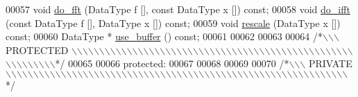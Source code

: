 \begin{DoxyCode}
00057     \textcolor{keywordtype}{void}                \hyperlink{a00010_a4c5b863a285c5a87f38517735cbf1352}{do\_fft} (DataType f [], \textcolor{keyword}{const} DataType x []) \textcolor{keyword}{const};
00058     \textcolor{keywordtype}{void}                \hyperlink{a00010_a8ab2e0da482cea88a61f01d58c074989}{do\_ifft} (\textcolor{keyword}{const} DataType f [], DataType x []) \textcolor{keyword}{const};
00059     \textcolor{keywordtype}{void}                \hyperlink{a00010_a9e30fff775905b1059aa9299004ee228}{rescale} (DataType x []) \textcolor{keyword}{const};
00060     DataType *      \hyperlink{a00010_af1fcd007f1cf0b41bd2188e0b3cd5cca}{use\_buffer} () \textcolor{keyword}{const};
00061 
00062 
00063 
00064 \textcolor{comment}{/*\(\backslash\)\(\backslash\)\(\backslash\) PROTECTED \(\backslash\)\(\backslash\)\(\backslash\)\(\backslash\)\(\backslash\)\(\backslash\)\(\backslash\)\(\backslash\)\(\backslash\)\(\backslash\)\(\backslash\)\(\backslash\)\(\backslash\)\(\backslash\)\(\backslash\)\(\backslash\)\(\backslash\)\(\backslash\)\(\backslash\)\(\backslash\)\(\backslash\)\(\backslash\)\(\backslash\)\(\backslash\)\(\backslash\)\(\backslash\)\(\backslash\)\(\backslash\)\(\backslash\)\(\backslash\)\(\backslash\)\(\backslash\)\(\backslash\)\(\backslash\)\(\backslash\)\(\backslash\)\(\backslash\)\(\backslash\)\(\backslash\)\(\backslash\)\(\backslash\)\(\backslash\)\(\backslash\)\(\backslash\)\(\backslash\)\(\backslash\)\(\backslash\)\(\backslash\)\(\backslash\)\(\backslash\)\(\backslash\)\(\backslash\)\(\backslash\)\(\backslash\)\(\backslash\)\(\backslash\)\(\backslash\)\(\backslash\)\(\backslash\)\(\backslash\)*/}
00065 
00066 \textcolor{keyword}{protected}:
00067 
00068 
00069 
00070 \textcolor{comment}{/*\(\backslash\)\(\backslash\)\(\backslash\) PRIVATE \(\backslash\)\(\backslash\)\(\backslash\)\(\backslash\)\(\backslash\)\(\backslash\)\(\backslash\)\(\backslash\)\(\backslash\)\(\backslash\)\(\backslash\)\(\backslash\)\(\backslash\)\(\backslash\)\(\backslash\)\(\backslash\)\(\backslash\)\(\backslash\)\(\backslash\)\(\backslash\)\(\backslash\)\(\backslash\)\(\backslash\)\(\backslash\)\(\backslash\)\(\backslash\)\(\backslash\)\(\backslash\)\(\backslash\)\(\backslash\)\(\backslash\)\(\backslash\)\(\backslash\)\(\backslash\)\(\backslash\)\(\backslash\)\(\backslash\)\(\backslash\)\(\backslash\)\(\backslash\)\(\backslash\)\(\backslash\)\(\backslash\)\(\backslash\)\(\backslash\)\(\backslash\)\(\backslash\)\(\backslash\)\(\backslash\)\(\backslash\)\(\backslash\)\(\backslash\)\(\backslash\)\(\backslash\)\(\backslash\)\(\backslash\)\(\backslash\)\(\backslash\)\(\backslash\)\(\backslash\)\(\backslash\)\(\backslash\)*/}

\end{DoxyCode}
